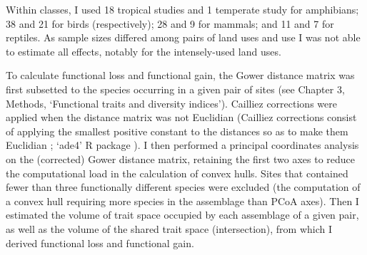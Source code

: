 Within classes, I used 18 tropical studies and 1 temperate study for amphibians; 38 and 21 for birds (respectively); 28 and 9 for mammals; and 11 and 7 for reptiles. As sample sizes differed among pairs of land uses and use I was not able to estimate all effects, notably for the intensely-used land uses. 

To calculate functional loss and functional gain, the Gower distance matrix was first subsetted to the species occurring in a given pair of sites (see Chapter 3, Methods, `Functional traits and diversity indices'). Cailliez corrections were applied when the distance matrix was not Euclidian (Cailliez corrections consist of applying the smallest positive constant to the distances so as to make them Euclidian \citep{Cailliez1983}; `ade4' R package \citep{ade4package}). I then performed a principal coordinates analysis on the (corrected) Gower distance matrix, retaining the first two axes to reduce the computational load in the calculation of convex hulls. Sites that contained fewer than three functionally different species were excluded (the computation of a convex hull requiring more species in the assemblage than PCoA axes). Then I estimated the volume of trait space occupied by each assemblage of a given pair, as well as the volume of the shared trait space (intersection), from which I derived functional loss and functional gain.

